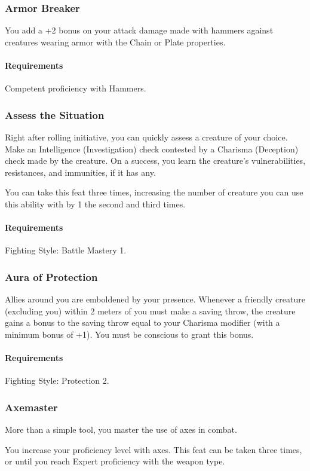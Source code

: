 \subsubsection{Armor Breaker} \label{feat::armorbreaker}
    You add a +2 bonus on your attack damage made with hammers against creatures wearing armor with the Chain or Plate properties.
    \paragraph{Requirements} Competent proficiency with Hammers.
\subsubsection{Assess the Situation} \label{feat::assessthesituation}
    Right after rolling initiative, you can quickly assess a creature of your choice.
    Make an Intelligence (Investigation) check contested by a Charisma (Deception) check made by the creature.
    On a success, you learn the creature's vulnerabilities, resistances, and immunities, if it has any.

    You can take this feat three times, increasing the number of creature you can use this ability with by 1 the second and third times.
    \paragraph{Requirements} Fighting Style: Battle Mastery 1.
\subsubsection{Aura of Protection} \label{feat::auraofprotection}
    Allies around you are emboldened by your presence.
    Whenever a friendly creature (excluding you) within 2 meters of you must make a saving throw, the creature gains a bonus to the saving throw equal to your Charisma modifier (with a minimum bonus of +1).
    You must be conscious to grant this bonus.
    \paragraph{Requirements} Fighting Style: Protection 2.
\subsubsection{Axemaster} \label{feat::axemaster}
    More than a simple tool, you master the use of axes in combat.

    You increase your proficiency level with axes.
    This feat can be taken three times, or until you reach Expert proficiency with the weapon type.
